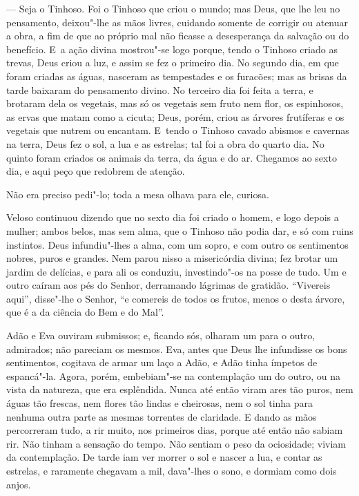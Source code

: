 \begin{linenumbers}
--- Seja o Tinhoso. Foi o Tinhoso que criou o mundo; mas Deus, que lhe
leu no pensamento, deixou"-lhe as mãos livres, cuidando somente de
corrigir ou atenuar a obra, a fim de que ao próprio mal não ficasse a
desesperança da salvação ou do benefício. E~a ação divina mostrou"-se
logo porque, tendo o Tinhoso criado as trevas, Deus criou a luz, e assim
se fez o primeiro dia. No segundo dia, em que foram criadas as águas,
nasceram as tempestades e os furacões; mas as brisas da tarde baixaram
do pensamento divino. No terceiro dia foi feita a terra, e brotaram dela
os vegetais, mas só os vegetais sem fruto nem flor, os espinhosos, as
ervas que matam como a cicuta; Deus, porém, criou as árvores frutíferas
e os vegetais que nutrem ou encantam. E~tendo o Tinhoso cavado abismos e
cavernas na terra, Deus fez o sol, a lua e as estrelas; tal foi a obra
do quarto dia. No quinto foram criados os animais da terra, da água e do
ar. Chegamos ao sexto dia, e aqui peço que redobrem de atenção.

Não era preciso pedi"-lo; toda a mesa olhava para ele, curiosa.

Veloso continuou dizendo que no sexto dia foi criado o homem, e logo
depois a mulher; ambos belos, mas sem alma, que o Tinhoso não podia dar,
e só com ruins instintos. Deus infundiu"-lhes a alma, com um sopro, e com
outro os sentimentos nobres, puros e grandes. Nem parou nisso a
misericórdia divina; fez brotar um jardim de delícias, e para ali os
conduziu, investindo"-os na posse de tudo. Um e outro caíram aos pés do
Senhor, derramando lágrimas de gratidão. ``Vivereis aqui'', disse"-lhe o
Senhor, ``e comereis de todos os frutos, menos o desta árvore, que é a
da ciência do Bem e do Mal''.

Adão e Eva ouviram submissos; e, ficando sós, olharam um para o outro,
admirados; não pareciam os mesmos. Eva, antes que Deus lhe infundisse os
bons sentimentos, cogitava de armar um laço a Adão, e Adão tinha ímpetos
de espancá"-la. Agora, porém, embebiam"-se na contemplação um do outro, ou
na vista da natureza, que era esplêndida. Nunca até então viram ares tão
puros, nem águas tão frescas, nem flores tão lindas e cheirosas, nem o
sol tinha para nenhuma outra parte as mesmas torrentes de claridade. E
dando as mãos percorreram tudo, a rir muito, nos primeiros dias, porque
até então não sabiam rir. Não tinham a sensação do tempo. Não sentiam o
peso da ociosidade; viviam da contemplação. De tarde iam ver morrer o
sol e nascer a lua, e contar as estrelas, e raramente chegavam a mil,
dava"-lhes o sono, e dormiam como dois anjos.


\end{linenumbers}
